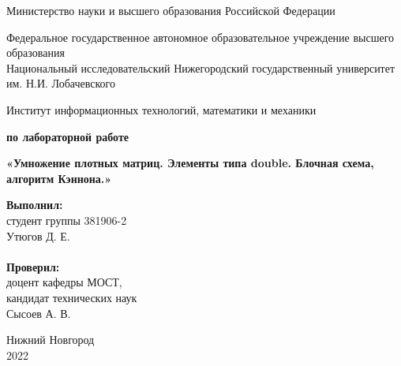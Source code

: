 \documentclass{report}
\begin{document}
\begin{titlepage}

\begin{center}
Министерство науки и высшего образования Российской Федерации
\end{center}

\begin{center}
Федеральное государственное автономное образовательное учреждение высшего образования \\
Национальный исследовательский Нижегородский государственный университет им. Н.И. Лобачевского
\end{center}

\begin{center}
Институт информационных технологий, математики и механики
\end{center}

\vspace{4em}

\begin{center}
\textbf{ по лабораторной работе} \\
\end{center}
\begin{center}
\textbf{\Large«Умножение плотных матриц. Элементы типа double. Блочная схема, алгоритм Кэннона.»} \\
\end{center}

\vspace{4em}

\newbox{\lbox}
\newlength{\maxl}
\setlength{\maxl}{\wd\lbox}
\hfill\parbox{7cm}{
\hspace*{5cm}\hspace*{-5cm}\textbf{Выполнил:} \\ студент группы 381906-2 \\ Утюгов Д. Е.\\
\\
\hspace*{5cm}\hspace*{-5cm}\textbf{Проверил:}\\ доцент кафедры МОСТ, \\ кандидат технических наук \\ Сысоев А. В.\\
}
\vspace{\fill}

\begin{center} Нижний Новгород \\ 2022 \end{center}

\end{titlepage}
\end{document}
